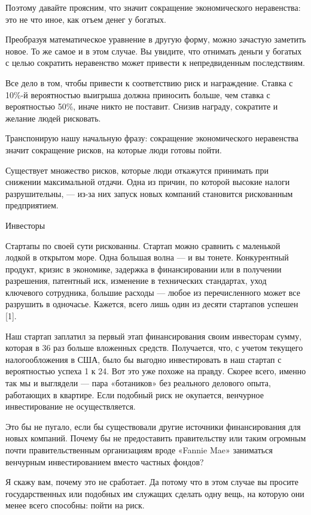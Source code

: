 \documentclass[ebook,12pt,oneside,openany]{memoir}
\begin{document}
Поэтому давайте проясним, что значит сокращение экономического
неравенства: это не что иное, как отъем денег у богатых.

Преобразуя математическое уравнение в другую форму, можно зачастую
заметить новое. То же самое и в этом случае. Вы увидите, что отнимать
деньги у богатых с целью сократить неравенство может привести к
непредвиденным последствиям.

Все дело в том, чтобы привести к соответствию риск и награждение.
Ставка с 10\%-й вероятностью выигрыша должна приносить больше, чем
ставка с вероятностью 50\%, иначе никто не поставит. Снизив награду,
сократите и желание людей рисковать.

Транспонирую нашу начальную фразу: сокращение экономического
неравенства значит сокращение рисков, на которые люди готовы пойти.

Существует множество рисков, которые люди откажутся принимать при
снижении максимальной отдачи. Одна из причин, по которой высокие
налоги разрушительны, — из-за них запуск новых компаний становится
рискованным предприятием.

Инвесторы

Стартапы по своей сути рискованны. Стартап можно сравнить с маленькой
лодкой в открытом море. Одна большая волна — и вы тонете. Конкурентный
продукт, кризис в экономике, задержка в финансировании или в получении
разрешения, патентный иск, изменение в технических стандартах, уход
ключевого сотрудника, большие расходы — любое из перечисленного может
все разрушить в одночасье. Кажется, всего лишь один из десяти
стартапов успешен [1].

Наш стартап заплатил за первый этап финансирования своим инвесторам
сумму, которая в 36 раз больше вложенных средств. Получается, что, с
учетом текущего налогообложения в США, было бы выгодно инвестировать в
наш стартап с вероятностью успеха 1 к 24. Вот это уже похоже на
правду. Скорее всего, именно так мы и выглядели — пара «ботаников» без
реального делового опыта, работающих в квартире. Если подобный риск не
окупается, венчурное инвестирование не осуществляется.

Это бы не пугало, если бы существовали другие источники финансирования
для новых компаний. Почему бы не предоставить правительству или таким
огромным почти правительственным организациям вроде «Fannie Mae»
заниматься венчурным инвестированием вместо частных фондов?

Я скажу вам, почему это не сработает. Да потому что в этом случае вы
просите государственных или подобных им служащих сделать одну вещь, на
которую они менее всего способны: пойти на риск.
\end{document}
